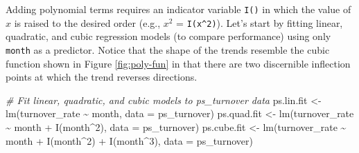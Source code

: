 \documentclass[
]{book}
\newenvironment{Shaded}{\begin{snugshade}}{\end{snugshade}}
\newcommand{\AttributeTok}[1]{\textcolor[rgb]{0.77,0.63,0.00}{#1}}
\newcommand{\CommentTok}[1]{\textcolor[rgb]{0.56,0.35,0.01}{\textit{#1}}}
\newcommand{\DecValTok}[1]{\textcolor[rgb]{0.00,0.00,0.81}{#1}}
\newcommand{\FunctionTok}[1]{\textcolor[rgb]{0.00,0.00,0.00}{#1}}
\newcommand{\NormalTok}[1]{#1}
\newcommand{\OtherTok}[1]{\textcolor[rgb]{0.56,0.35,0.01}{#1}}
\newcommand{\SpecialCharTok}[1]{\textcolor[rgb]{0.00,0.00,0.00}{#1}}
\begin{document}
Adding polynomial terms requires an indicator variable \texttt{I()} in which the value of \(x\) is raised to the desired order (e.g., \(x^2\) = \texttt{I(x\^{}2)}). Let's start by fitting linear, quadratic, and cubic regression models (to compare performance) using only \texttt{month} as a predictor. Notice that the shape of the trends resemble the cubic function shown in Figure \ref{fig:poly-fun} in that there are two discernible inflection points at which the trend reverses directions.

\begin{Shaded}
\begin{Highlighting}[]
\CommentTok{\# Fit linear, quadratic, and cubic models to ps\_turnover data}
\NormalTok{ps.lin.fit }\OtherTok{\textless{}{-}} \FunctionTok{lm}\NormalTok{(turnover\_rate }\SpecialCharTok{\textasciitilde{}}\NormalTok{ month, }\AttributeTok{data =}\NormalTok{ ps\_turnover)}
\NormalTok{ps.quad.fit }\OtherTok{\textless{}{-}} \FunctionTok{lm}\NormalTok{(turnover\_rate }\SpecialCharTok{\textasciitilde{}}\NormalTok{ month }\SpecialCharTok{+} \FunctionTok{I}\NormalTok{(month}\SpecialCharTok{\^{}}\DecValTok{2}\NormalTok{), }\AttributeTok{data =}\NormalTok{ ps\_turnover)}
\NormalTok{ps.cube.fit }\OtherTok{\textless{}{-}} \FunctionTok{lm}\NormalTok{(turnover\_rate }\SpecialCharTok{\textasciitilde{}}\NormalTok{ month }\SpecialCharTok{+} \FunctionTok{I}\NormalTok{(month}\SpecialCharTok{\^{}}\DecValTok{2}\NormalTok{) }\SpecialCharTok{+} \FunctionTok{I}\NormalTok{(month}\SpecialCharTok{\^{}}\DecValTok{3}\NormalTok{), }\AttributeTok{data =}\NormalTok{ ps\_turnover)}
\end{Highlighting}
\end{Shaded}

\providecommand{\docline}[3]{\noalign{\global\setlength{\arrayrulewidth}{#1}}\arrayrulecolor[HTML]{#2}\cline{#3}}

\setlength{\tabcolsep}{2pt}

\renewcommand*{\arraystretch}{1.5}
\end{document}
